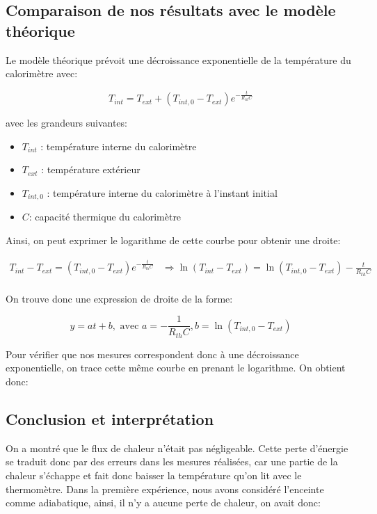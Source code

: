 \documentclass[12pt]{article}
\begin{document}
\newpage
\subsection{Comparaison de nos résultats avec le modèle théorique}
Le modèle théorique prévoit une décroissance exponentielle de la température du calorimètre avec:

\begin{equation}
	T_{int} = T_{ext} + (T_{int, 0} - T_{ext}) e^{- \frac{t}{R_{th}C}}
\end{equation}

avec les grandeurs suivantes:
\begin{itemize}
	\item $T_{int}$ : température interne du calorimètre
	\item $T_{ext}$ : température extérieur
	\item $T_{int, 0}$ : température interne du calorimètre à l'instant initial
	\item $C$: capacité thermique du calorimètre
\end{itemize}

Ainsi, on peut exprimer le logarithme de cette courbe pour obtenir une droite:

\begin{align*}
	T_{int} - T_{ext} = (T_{int, 0} - T_{ext}) e^{- \frac{t}{R_{th}C}} & \Rightarrow \ln(T_{int} - T_{ext}) = \ln(T_{int, 0} - T_{ext}) - \frac{t}{R_{th}C} \\
\end{align*}

On trouve donc une expression de droite de la forme:

\begin{equation}
	y = at + b, \text{ avec } a = - \frac{1}{R_{th}C}, b = \ln(T_{int, 0} - T_{ext})
\end{equation}

Pour vérifier que nos mesures correspondent donc à une décroissance exponentielle, on trace cette même courbe en prenant le logarithme. On obtient donc:

\subsection{Conclusion et interprétation}
On a montré que le flux de chaleur n'était pas négligeable. Cette perte d'énergie se traduit donc par des erreurs dans les mesures réalisées, car une partie de la chaleur s'échappe et fait donc baisser la température qu'on lit
avec le thermomètre. Dans la première expérience, nous avons considéré l'enceinte comme adiabatique, ainsi, il n'y a aucune perte de chaleur, on avait donc:
\end{document}
